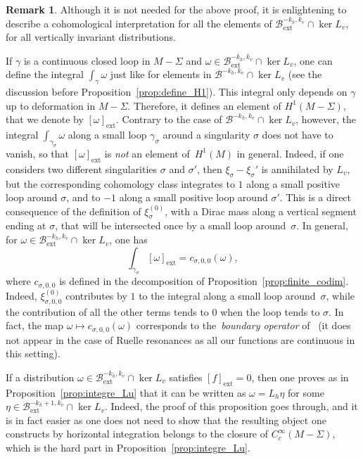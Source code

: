\documentclass[10pt]{amsart}
\newcommand{\ext}{\mathrm{ext}}
\newcommand{\boB}{\mathcal{B}}
\theoremstyle{definition}
\newtheorem{rmk}[thm]{Remark}
\numberwithin{equation}{section}
\begin{document}
\begin{rmk}
\label{rmk:cohomological} Although it is not needed for the above proof, it
is enlightening to describe a cohomological interpretation for all the
elements of $\boB^{-k_h, k_v}_{\ext} \cap \ker L_v$, \ie for all vertically
invariant distributions.

If $\gamma$ is a continuous closed loop in $M-\Sigma$ and $\omega \in
\boB^{-k_h, k_v}_{\ext} \cap \ker L_v$, one can define the integral
$\int_\gamma \omega$ just like for elements in $\boB^{-k_h, k_v} \cap \ker
L_v$ (see the discussion before Proposition~\ref{prop:define_H1}). This
integral only depends on $\gamma$ up to deformation in $M-\Sigma$. Therefore,
it defines an element of $H^1(M-\Sigma)$, that we denote by $[\omega]_{\ext}$.
Contrary to the case of $\boB^{-k_h, k_v} \cap \ker L_v$, however, the
integral $\int_{\gamma_\sigma} \omega$ along a small loop $\gamma_\sigma$
around a singularity $\sigma$ does not have to vanish, so that
$[\omega]_{\ext}$ is \emph{not} an element of~$H^1(M)$ in general. Indeed, if
one considers two different singularities $\sigma$ and $\sigma'$, then
$\xi_\sigma-\xi_\sigma'$ is annihilated by $L_v$, but the corresponding
cohomology class integrates to $1$ along a small positive loop around
$\sigma$, and to $-1$ along a small positive loop around $\sigma'$. This is a
direct consequence of the definition of $\xi_\sigma^{(0)}$, with a Dirac mass
along a vertical segment ending at $\sigma$, that will be intersected once by
a small loop around~$\sigma$. In general, for $\omega \in \boB^{-k_h,
k_v}_{\ext} \cap \ker L_v$, one has
\begin{equation}
\label{eq:pwuixcvpoiupwoxv}
\int_{\gamma_\sigma} [\omega]_{\ext} = c_{\sigma, 0, 0}(\omega),
\end{equation}
where $c_{\sigma, 0, 0}$ is defined in the decomposition of
Proposition~\ref{prop:finite_codim}. Indeed, $\xi^{(0)}_{\sigma, 0, 0}$
contributes by $1$ to the integral along a small loop around~$\sigma$, while
the contribution of all the other terms tends to $0$ when the loop tends to
$\sigma$. In fact, the map $\omega \mapsto c_{\sigma, 0, 0}(\omega)$ corresponds
to the~\emph{boundary operator} of~\cite{marmi_yoccoz_Holder} (it does not appear
in the case of Ruelle resonances as all our functions are continuous
in this setting).

If a distribution $\omega \in \boB^{-k_h, k_v}_{\ext} \cap \ker L_v$ satisfies
$[f]_{\ext} = 0$, then one proves as in Proposition~\ref{prop:integre_Lu} that
it can be written as $\omega=L_h \eta$ for some $\eta \in \boB_{\ext}^{-k_h+1,
k_v} \cap \ker L_v$. Indeed, the proof of this proposition goes through, and
it is in fact easier as one does not need to show that the resulting object
one constructs by horizontal integration belongs to the closure of
$C_c^\infty(M-\Sigma)$, which is the hard part in
Proposition~\ref{prop:integre_Lu}.


\end{rmk}
\end{document}
